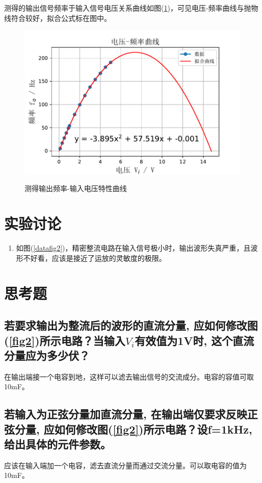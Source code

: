 \documentclass[a4paper]{article}
\begin{document}
测得的输出信号频率于输入信号电压关系曲线如图(\ref{Vfreq})，可见电压-频率曲线与抛物线符合较好，拟合公式标在图中。
\begin{figure}[!h]
\centering
\includegraphics[width=12cm]{fig/Vfreq.pdf}\\
\caption{测得输出频率-输入电压特性曲线}\label{Vfreq}
\end{figure}

\section{实验讨论}
\begin{enumerate}
\item 如图(\ref{datafig2})，精密整流电路在输入信号极小时，输出波形失真严重，且波形不好看，应该是接近了运放的灵敏度的极限。
\end{enumerate}

\section{思考题}
\subsection{若要求输出为整流后的波形的直流分量, 应如何修改图(\ref{fig2})所示电路？当输入$V_i$有效值为1V时, 这个直流分量应为多少伏？}
在输出端接一个电容到地，这样可以滤去输出信号的交流成分。电容的容值可取10mF。
\subsection{若输入为正弦分量加直流分量, 在输出端仅要求反映正弦分量, 应如何修改图(\ref{fig2})所示电路？设f=1kHz, 给出具体的元件参数。}
应该在输入端加一个电容，滤去直流分量而通过交流分量。可以取电容的值为10mF。

\nocite{jiaocai}

\end{document}
